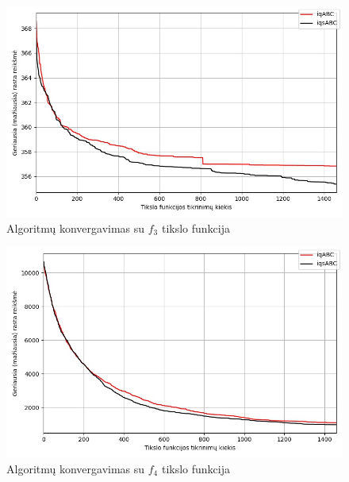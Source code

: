\documentclass{VUMIFKompMagistrinis}
\begin{document}
\begin{landscape}
\begin{multicols}{2}
\begin{figure}[H]
    \centering
    \includegraphics[scale=0.5]{img/2kg/f3.jpg}
    \caption{Algoritmų konvergavimas su $f_{3}$ tikslo funkcija}
    \label{img:vkonf3}
\end{figure}

\begin{figure}[H]
    \centering
    \includegraphics[scale=0.5]{img/2kg/f4.jpg}
    \caption{Algoritmų konvergavimas su $f_{4}$ tikslo funkcija}
    \label{img:vkonf4}
\end{figure}





\end{multicols}
\begin{multicols}{2}



\end{multicols}
\end{landscape}
\end{document}
